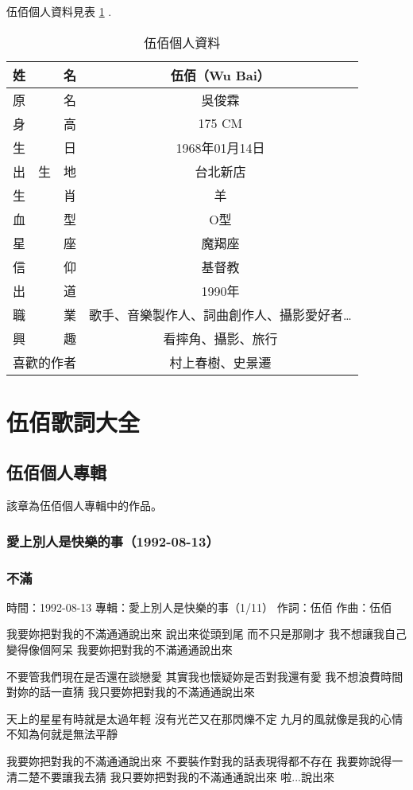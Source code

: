 \documentclass[UTF8,a4paper,oneside,twocolumn,12pt]{ctexbook}
\newcommand{\infopair}[2]{\textbullet #1：#2}
\newcommand{\zc}[1][伍佰]{\infopair{作詞}{#1}}
\newcommand{\zq}[1][伍佰]{\infopair{作曲}{#1}}
\newcommand{\zj}[1]{\infopair{專輯}{#1}}
\newcommand{\sj}[1]{\infopair{時間}{#1}}
\newenvironment{info}{\begin{flushleft}\kaishu
	}
	{\end{flushleft}\normalsize\yahei\par}
\newenvironment{lyric}{
	}
{}
\begin{document}
伍佰個人資料見表 \ref{tab:gerenziliao} .

\begin{table}[htbp]
	\caption{伍佰個人資料} \label{tab:gerenziliao}
	\centering
	\begin{tabular}{|c|c|}
		\hline
		姓　　　名 & 伍佰（Wu Bai） \\
		\hline
		原　　　名 & 吳俊霖 \\
		\hline
		身　　　高 & 175 CM \\
		\hline
		生　　　日 & 1968年01月14日 \\
		\hline
		出　生　地 & 台北新店 \\
		\hline
		生　　　肖 & 羊 \\
		\hline
		血　　　型 & O型 \\
		\hline
		星　　　座 & 魔羯座 \\
		\hline
		信　　　仰 & 基督教 \\
		\hline
		出　　　道 & 1990年 \\
		\hline
		職　　　業 & 歌手、音樂製作人、詞曲創作人、攝影愛好者… \\
		\hline
		興　　　趣 & 看摔角、攝影、旅行 \\
		\hline
		喜歡的作者 & 村上春樹、史景遷 \\
		\hline
	\end{tabular}
\end{table}

\tableofcontents

\mainmatter

\twocolumn
\part{伍佰歌詞大全}
\chapter{伍佰個人專輯}
該章為伍佰個人專輯中的作品。

\section*{愛上別人是快樂的事（1992-08-13）}
\section{不滿}
\begin{info}
	\sj{1992-08-13}
	\zj{愛上別人是快樂的事（1/11）}
	\zc
	\zq
\end{info}
\begin{lyric}
	我要妳把對我的不滿通通說出來
	說出來從頭到尾 而不只是那剛才
	我不想讓我自己變得像個阿呆
	我要妳把對我的不滿通通說出來

	不要管我們現在是否還在談戀愛
	其實我也懷疑妳是否對我還有愛
	我不想浪費時間對妳的話一直猜
	我只要妳把對我的不滿通通說出來

	天上的星星有時就是太過年輕
	沒有光芒又在那閃爍不定
	九月的風就像是我的心情
	不知為何就是無法平靜

	我要妳把對我的不滿通通說出來
	不要裝作對我的話表現得都不存在
	我要妳說得一清二楚不要讓我去猜
	我只要妳把對我的不滿通通說出來
	啦...說出來
\end{lyric}
\end{document}
